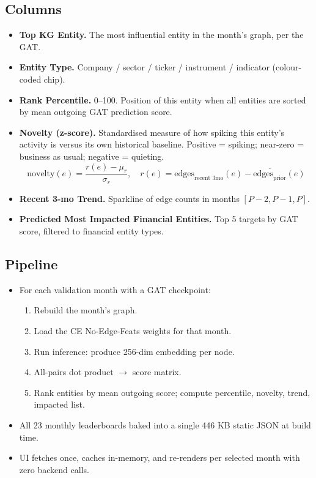 \documentclass[11pt]{article}
\begin{document}
\subsection{Columns}
\label{sec:predictions-cols}

\begin{itemize}
  \item \textbf{Top KG Entity.} The most influential entity in the month's graph, per the GAT.
  \item \textbf{Entity Type.} Company / sector / ticker / instrument / indicator (colour-coded chip).
  \item \textbf{Rank Percentile.} 0--100. Position of this entity when all entities are sorted by mean outgoing GAT prediction score.
  \item \textbf{Novelty (z-score).} Standardised measure of how spiking this entity's activity is versus its own historical baseline. Positive = spiking; near-zero = business as usual; negative = quieting.
    \[ \text{novelty}(e) = \frac{r(e) - \mu_r}{\sigma_r},\quad r(e) = \text{edges}_{\text{recent 3mo}}(e) - \overline{\text{edges}_{\text{prior}}}(e) \]
  \item \textbf{Recent 3-mo Trend.} Sparkline of edge counts in months \([P-2, P-1, P]\).
  \item \textbf{Predicted Most Impacted Financial Entities.} Top 5 targets by GAT score, filtered to financial entity types.
\end{itemize}

\subsection{Pipeline}
\begin{itemize}
  \item For each validation month with a GAT checkpoint:
    \begin{enumerate}
      \item Rebuild the month's graph.
      \item Load the CE No-Edge-Feats weights for that month.
      \item Run inference: produce 256-dim embedding per node.
      \item All-pairs dot product \(\to\) score matrix.
      \item Rank entities by mean outgoing score; compute percentile, novelty, trend, impacted list.
    \end{enumerate}
  \item All 23 monthly leaderboards baked into a single 446 KB static JSON at build time.
  \item UI fetches once, caches in-memory, and re-renders per selected month with zero backend calls.
\end{itemize}
\end{document}
